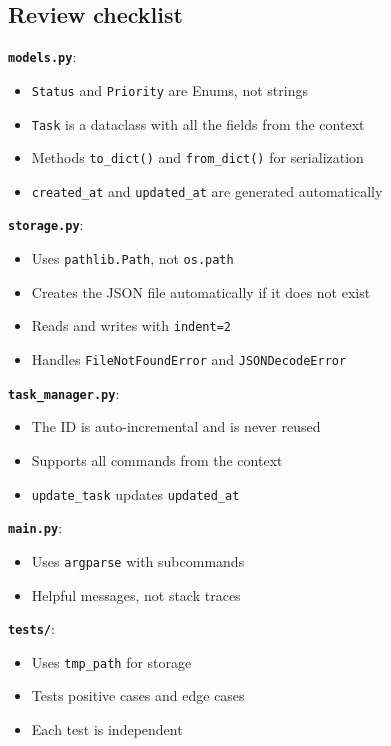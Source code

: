 \subsection*{Review checklist}

\textbf{\texttt{models.py}}:
\begin{itemize}
  \item \texttt{Status} and \texttt{Priority} are Enums, not strings
  \item \texttt{Task} is a dataclass with all the fields from the context
  \item Methods \texttt{to\_dict()} and \texttt{from\_dict()} for serialization
  \item \texttt{created\_at} and \texttt{updated\_at} are generated automatically
\end{itemize}

\textbf{\texttt{storage.py}}:
\begin{itemize}
  \item Uses \texttt{pathlib.Path}, not \texttt{os.path}
  \item Creates the JSON file automatically if it does not exist
  \item Reads and writes with \texttt{indent=2}
  \item Handles \texttt{FileNotFoundError} and \texttt{JSONDecodeError}
\end{itemize}

\textbf{\texttt{task\_manager.py}}:
\begin{itemize}
  \item The ID is auto-incremental and is never reused
  \item Supports all commands from the context
  \item \texttt{update\_task} updates \texttt{updated\_at}
\end{itemize}

\textbf{\texttt{main.py}}:
\begin{itemize}
  \item Uses \texttt{argparse} with subcommands
  \item Helpful messages, not stack traces
\end{itemize}

\textbf{\texttt{tests/}}:
\begin{itemize}
  \item Uses \texttt{tmp\_path} for storage
  \item Tests positive cases and edge cases
  \item Each test is independent
\end{itemize}

